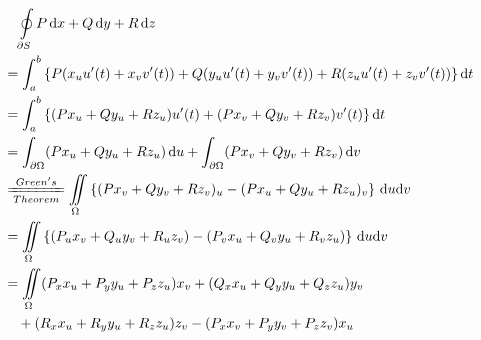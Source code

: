 \begin{align*}
     & \quad\oint\limits_{\partial S}P\,\mathrm{d}x+Q\,\mathrm{d}y+R\,\mathrm{d}z                                                                                                                                                                                                                             \\
     & =\int_a^b\left\{P(x_uu'(t)+x_vv'(t))+Q(y_uu'(t)+y_vv'(t))+R(z_uu'(t)+z_vv'(t))\right\}\mathrm{d}t                                                                                                                                                                                                      \\
     & =\int_a^b\left\{(P x_u+Q y_u+R z_u)u'(t)+(P x_v+Q y_v+R z_v)v'(t)\right\}\mathrm{d}t                                                                                                                                                                                                                   \\
     & =\int_{\partial\Omega}(P x_u+Q y_u+R z_u)\,\mathrm{d}u+\int_{\partial\Omega}(P x_v+Q y_v+R z_v)\,\mathrm{d}v                                                                                                                                                                                           \\
     & \xlongequal[Theorem]{Green's}\iint\limits_{\Omega}\left\{(P x_v+Q y_v+R z_v)_u-(P x_u+Q y_u+R z_u)_v\right\}\,\mathrm{d}u\mathrm{d}v                                                                                                                                                                   \\
     & =\iint\limits_{\Omega}\left\{(P_u x_v+Q_u y_v+R_u z_v)-(P_v x_u+Q_v y_u+R_v z_u)\right\}\,\mathrm{d}u\mathrm{d}v                                                                                                                                                                                       \\
     & =\iint\limits_{\Omega}(P_xx_u+P_yy_u+P_zz_u)x_v+(Q_xx_u+Q_yy_u+Q_zz_u)y_v                                                                                                                                                                                                                              \\
     & \quad+(R_xx_u+R_yy_u+R_zz_u)z_v-(P_xx_v+P_yy_v+P_zz_v)x_u                                                                                                                                                                                                                                              \\

\end{align*}
